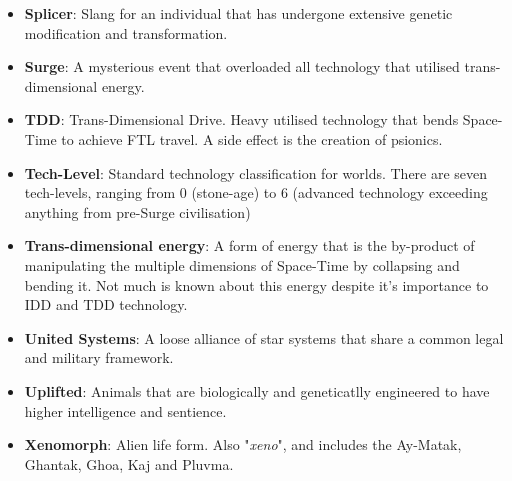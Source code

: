 \documentclass[10pt,twoside]{article}
\begin{document}
\begin{multicols}{2}
\begin{itemize}
    \item \textbf{Splicer}: Slang for an individual that has undergone extensive genetic modification and transformation.

    \item \textbf{Surge}: A mysterious event that overloaded all technology that utilised trans-dimensional energy.

    \item \textbf{TDD}: Trans-Dimensional Drive. Heavy utilised technology that bends Space-Time to achieve FTL travel. A side effect is the creation of psionics.

    \item \textbf{Tech-Level}: Standard technology classification for worlds. There are seven tech-levels, ranging from 0 (stone-age) to 6 (advanced technology exceeding anything from pre-Surge civilisation)

    \item \textbf{Trans-dimensional energy}: A form of energy that is the by-product of manipulating the multiple dimensions of Space-Time by collapsing and bending it. Not much is known about this energy despite it's importance to IDD and TDD technology.

    \item \textbf{United Systems}: A loose alliance of star systems that share a common legal and military framework.

    \item \textbf{Uplifted}: Animals that are biologically and geneticatlly engineered to have higher intelligence and sentience.

    \item \textbf{Xenomorph}: Alien life form. Also "\textit{xeno}", and includes the Ay-Matak, Ghantak, Ghoa, Kaj and Pluvma.

  \end{itemize}

  \end{multicols}
\end{document}
